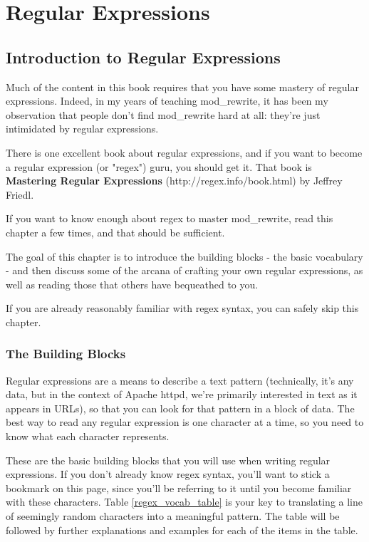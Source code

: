 \part{Regular Expressions}

\chapter{Introduction to Regular Expressions}
\label{chapter_regex}

Much of the content in this book requires that you have some mastery
of regular expressions. Indeed, in my years of teaching mod\_rewrite,
it has been my observation that people don't find mod\_rewrite hard at
all: they're just intimidated by regular expressions.

There is one excellent book about regular expressions, and if you want
to become a regular expression (or "regex") guru, you should get it. That
book is \textbf{Mastering Regular Expressions} (http://regex.info/book.html) by
Jeffrey Friedl.

If you want to know enough about regex to master mod\_rewrite, read
this chapter a few times, and that should be sufficient.

The goal of this chapter is to introduce the building blocks - the basic vocabulary - and 
then discuss some of the arcana of crafting your own regular expressions, as well as reading 
those that others have bequeathed to you.

If you are already reasonably familiar with regex syntax, you can safely skip 
this chapter.

\section{The Building Blocks}

Regular expressions are a means to describe a text pattern (technically, it's any data, but 
in the context of Apache httpd, we're primarily interested in text as it appears in URLs), so that you can look for that pattern in a block of data. The 
best way to read any regular expression is one character at a time, so you need to know what 
each character represents.

These are the basic building blocks that you will use when writing regular expressions. If 
you don't already know regex syntax, you'll want to stick a bookmark on this page, since you'll be 
referring to it until you become familiar with these characters. Table \ref{regex_vocab_table} is your key to 
translating a line of seemingly random characters into a meaningful pattern. The table will be 
followed by further explanations and examples for each of the items in the table.

